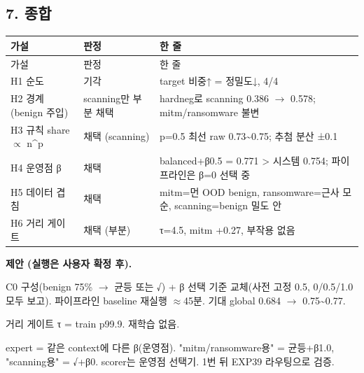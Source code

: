 \subsection{7. 종합}
\begingroup
\footnotesize
\begin{longtable}{>{\raggedright\arraybackslash}p{}>{\raggedright\arraybackslash}p{}>{\raggedright\arraybackslash}p{}}
\toprule
가설 & 판정 & 한 줄 \\ \midrule
\endfirsthead
가설 & 판정 & 한 줄 \\ \midrule
\endhead
{}H1 순도 & 기각 & target 비중↑ =\allowbreak{} 정밀도↓, 4/\allowbreak{}4 \\
{}H2 경계 (benign 주입) & scanning만 부분 채택 & hardneg로 scanning 0.386 \ensuremath{\rightarrow} 0.578; mitm/\allowbreak{}ransomware 불변 \\
{}H3 규칙 share \ensuremath{\propto} n\textasciicircum{}p & 채택 (scanning) & p=\allowbreak{}0.5 최선 raw 0.73\textasciitilde{}0.75; 추첨 분산 ±0.1 \\
{}H4 운영점 β & 채택 & balanced+\allowbreak{}β0.5 =\allowbreak{} 0.771 > 시스템 0.754; 파이프라인은 β=\allowbreak{}0 선택 중 \\
{}H5 데이터 겹침 & 채택 & mitm=\allowbreak{}먼 OOD benign, ransomware=\allowbreak{}근사 모순, scanning=\allowbreak{}benign 밀도 안 \\
{}H6 거리 게이트 & 채택 (부분) & τ=\allowbreak{}4.5, mitm +\allowbreak{}0.27, 부작용 없음 \\
\bottomrule
\end{longtable}
\endgroup
\textbf{제안 (실행은 사용자 확정 후).}

\par\noindent \textbullet\enspace C0 구성(benign 75\%  \ensuremath{\rightarrow}  균등 또는 √) +\allowbreak{} β 선택 기준 교체(사전 고정 0.5, 0/\allowbreak{}0.5/\allowbreak{}1.0 모두 보고). 파이프라인 baseline 재실행 \ensuremath{\approx}45분. 기대 global 0.684  \ensuremath{\rightarrow}  0.75\textasciitilde{}0.77.


\par\noindent \textbullet\enspace 거리 게이트 τ =\allowbreak{} train p99.9. 재학습 없음.


\par\noindent \textbullet\enspace expert =\allowbreak{} 같은 context에 다른 β(운영점). "mitm/\allowbreak{}ransomware용" =\allowbreak{} 균등+\allowbreak{}β1.0, "scanning용" =\allowbreak{} √+\allowbreak{}β0. scorer는 운영점 선택기. 1번 뒤 EXP39 라우팅으로 검증.


